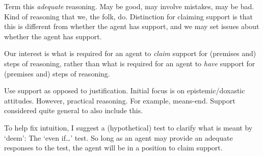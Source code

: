 \begin{note}
  Term this \emph{adequate} reasoning.
  May be good, may involve mistakes, may be bad.
  Kind of reasoning that we, the folk, do.
  Distinction for claiming support is that this is different from whether the agent has support, and we may set issues about whether the agent has support.

  Our interest is what is required for an agent to \emph{claim} support for (premises and) steps of reasoning, rather than what is required for an agent to \emph{have} support for (premises and) steps of reasoning.

  Use support as opposed to justification.
  Initial focus is on epistemic/doxastic attitudes.
  However, practical reasoning.
  For example, means-end.
  Support considered quite general to also include this.
\end{note}

\begin{note}
  To help fix intuition, I suggest a (hypothetical) test to clarify what is meant by `deem': The `even if\dots' test.
  So long as an agent may provide an adequate responses to the test, the agent will be in a position to claim support.
\end{note}

